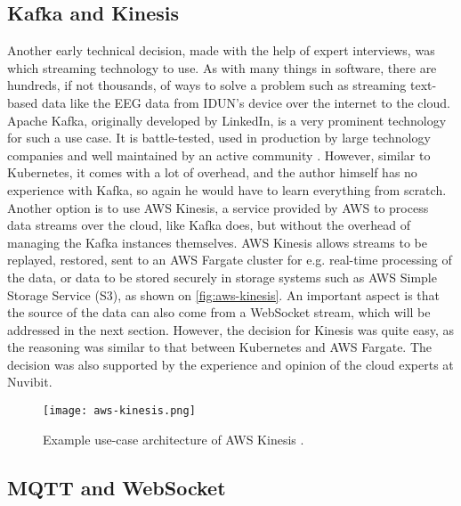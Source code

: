 \subsection{Kafka and Kinesis}
\label{chapter4-kafka-aws-kinesis}

Another early technical decision, made with the help of expert interviews, was which streaming technology to use. As with many things in software, there are hundreds, if not thousands, of ways to solve a problem such as streaming text-based data like the EEG data from IDUN's device over the internet to the cloud. Apache Kafka, originally developed by LinkedIn, is a very prominent technology for such a use case. It is battle-tested, used in production by large technology companies \citep{apache_apache_nodate} and well maintained by an active community \citep{noauthor_apache_2022}. However, similar to Kubernetes, it comes with a lot of overhead, and the author himself has no experience with Kafka, so again he would have to learn everything from scratch. Another option is to use AWS Kinesis, a service provided by AWS to process data streams over the cloud, like Kafka does, but without the overhead of managing the Kafka instances themselves. AWS Kinesis allows streams to be replayed, restored, sent to an AWS Fargate cluster for e.g. real-time processing of the data, or data to be stored securely in storage systems such as AWS Simple Storage Service (S3), as shown on \autoref{fig:aws-kinesis}. An important aspect is that the source of the data can also come from a WebSocket stream, which will be addressed in the next section. However, the decision for Kinesis was quite easy, as the reasoning was similar to that between Kubernetes and AWS Fargate. The decision was also supported by the experience and opinion of the cloud experts at Nuvibit.

\begin{figure}[!ht]
  \centering
  \texttt{[image: aws-kinesis.png]}
  \caption{Example use-case architecture of AWS Kinesis \citep{aws_amazon_nodate}.}
  \label{fig:aws-kinesis}
\end{figure}

\subsection{MQTT and WebSocket}
\label{chapter4-mqtt-and-websocket}


